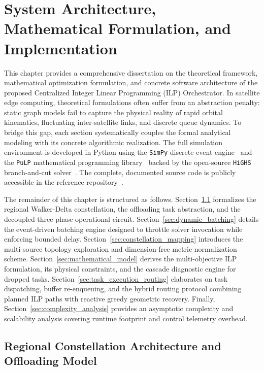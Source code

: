 \chapter{System Architecture, Mathematical Formulation, and Implementation}
\label{chap:ilp_architecture}

This chapter provides a comprehensive dissertation on the theoretical framework, mathematical optimization formulation, and concrete software architecture of the proposed Centralized Integer Linear Programming (ILP) Orchestrator. 
In satellite edge computing, theoretical formulations often suffer from an abstraction penalty: static graph models fail to capture the physical reality of rapid orbital kinematics, fluctuating inter-satellite links, and discrete queue dynamics. 
To bridge this gap, each section systematically couples the formal analytical modeling with its concrete algorithmic realization. The full simulation environment is developed in Python using the \texttt{SimPy} discrete-event engine~\cite{simpy2023} and the \texttt{PuLP} mathematical programming library~\cite{pulp2011} backed by the open-source \texttt{HiGHS} branch-and-cut solver~\cite{huangfu2018highs}. The complete, documented source code is publicly accessible in the reference repository~\cite{bagini_repo_2026}.

The remainder of this chapter is structured as follows. Section~\ref{sec:system_model} formalizes the regional Walker-Delta constellation, the offloading task abstraction, and the decoupled three-phase operational circuit. 
Section~\ref{sec:dynamic_batching} details the event-driven batching engine designed to throttle solver invocation while enforcing bounded delay. 
Section~\ref{sec:constellation_mapping} introduces the multi-source topology exploration and dimension-free metric normalization scheme. 
Section~\ref{sec:mathematical_model} derives the multi-objective ILP formulation, its physical constraints, and the cascade diagnostic engine for dropped tasks. 
Section~\ref{sec:task_execution_routing} elaborates on task dispatching, buffer re-enqueuing, and the hybrid routing protocol combining planned ILP paths with reactive greedy geometric recovery. 
Finally, Section~\ref{sec:complexity_analysis} provides an asymptotic complexity and scalability analysis covering runtime footprint and control telemetry overhead.

\section{Regional Constellation Architecture and Offloading Model}
\label{sec:system_model}

